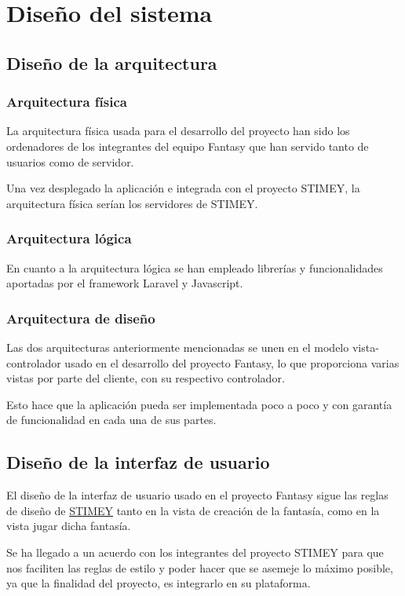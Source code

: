 \chapter{Diseño del sistema}
\section{Diseño de la arquitectura}
\subsection{Arquitectura física}
La arquitectura física usada para el desarrollo del proyecto han sido los ordenadores de los integrantes del equipo Fantasy que han servido tanto de usuarios como de servidor.

Una vez desplegado la aplicación e integrada con el proyecto STIMEY, la arquitectura física serían los servidores de STIMEY.

\subsection{Arquitectura lógica}
En cuanto a la arquitectura lógica se han empleado librerías y funcionalidades aportadas por el framework Laravel y Javascript.

\subsection{Arquitectura de diseño}
Las dos arquitecturas anteriormente mencionadas se unen en el modelo vista-controlador usado en el desarrollo del proyecto Fantasy, lo que proporciona varias vistas por parte del cliente, con su respectivo controlador.

Esto hace que la aplicación pueda ser implementada poco a poco y con garantía de funcionalidad en cada una de sus partes.

\section{Diseño de la interfaz de usuario}
El diseño de la interfaz de usuario usado en el proyecto Fantasy sigue las reglas de diseño de \href{https://stimey.eu/home}{STIMEY} tanto en la vista de creación de la fantasía, como en la vista jugar dicha fantasía.

Se ha llegado a un acuerdo con los integrantes del proyecto STIMEY para que nos faciliten las reglas de estilo y poder hacer que se asemeje lo máximo posible, ya que la finalidad del proyecto, es integrarlo en su plataforma.

